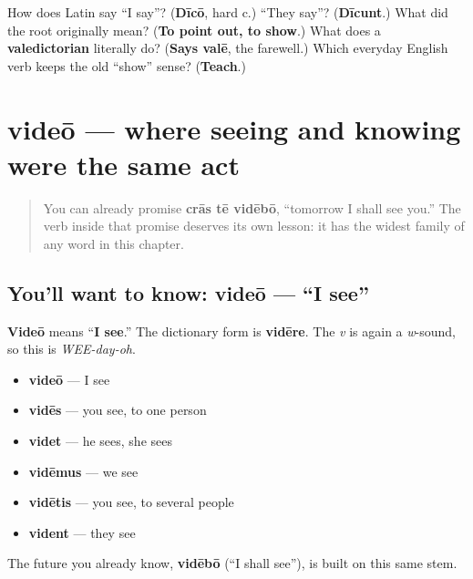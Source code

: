 \begin{tcolorbox}[breakable,colback=teal!4,colframe=teal!35!black,title={Before you move on}]
How does Latin say \textquotedblleft{}I say\textquotedblright{}? (\textbf{Dīcō}, hard c.) \textquotedblleft{}They say\textquotedblright{}? (\textbf{Dīcunt}.) What did the root originally mean? (\textbf{To point out, to show}.) What does a \textbf{valedictorian} literally do? (\textbf{Says valē}, the farewell.) Which everyday English verb keeps the old \textquotedblleft{}show\textquotedblright{} sense? (\textbf{Teach}.)
\end{tcolorbox}
\section[videō, vidēre]{videō — where seeing and knowing were the same act}

\label{lesson:LA-C37-video}



\begin{quote}
You can already promise \textbf{crās tē vidēbō}, \textquotedblleft{}tomorrow I shall see you.\textquotedblright{} The verb inside that promise deserves its own lesson: it has the widest family of any word in this chapter.
\end{quote}

\subsection*{You'll want to know: videō — \textquotedblleft{}I see\textquotedblright{}}
\textbf{Videō} means \textquotedblleft{}\textbf{I see}.\textquotedblright{} The dictionary form is \textbf{vidēre}. The \emph{v} is again a \emph{w}-sound, so this is \emph{WEE-day-oh}.

\begin{itemize}
\raggedright
  \item \textbf{videō} — I see
  \item \textbf{vidēs} — you see, to one person
  \item \textbf{videt} — he sees, she sees
  \item \textbf{vidēmus} — we see
  \item \textbf{vidētis} — you see, to several people
  \item \textbf{vident} — they see
\end{itemize}

The future you already know, \textbf{vidēbō} (\textquotedblleft{}I shall see\textquotedblright{}), is built on this same stem.

